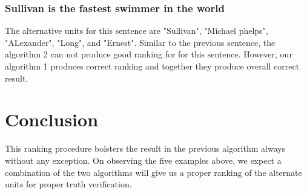 \documentclass[11pt]{article}
\begin{document}
\subsubsection{Sullivan is the fastest swimmer in the world}
The alternative units for this sentence are "Sullivan", "Michael phelps", "ALexander", "Long", and "Ernest". Similar to the previous sentence, the algorithm 2 can not produce good ranking for for this sentence. However, our algorithm 1 produces correct ranking and together they produce overall correct result.

\section{Conclusion}
This ranking procedure bolsters the result in the previous algorithm always without any exception. On observing the five examples above, we expect a combination of the two algorithms will give us a proper ranking of the alternate units for proper truth verification.
















\end{document}
